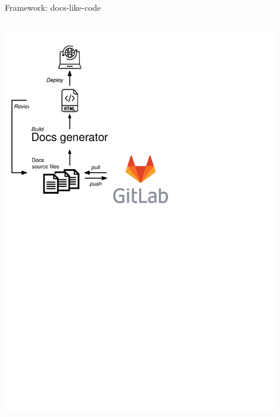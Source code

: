 \documentclass[english,aspectratio=169]{beamer}
\begin{document}
\begin{frame}{Framework: docs-like-code}
\begin{columns}[onlytextwidth]
\begin{column}{0.5\textwidth}
    \begin{center}
    \includegraphics[width=0.9\textwidth]{./figures/documentation-docs-like-code}
    \end{center}
\end{column}

\end{columns}

\end{frame}
\end{document}
